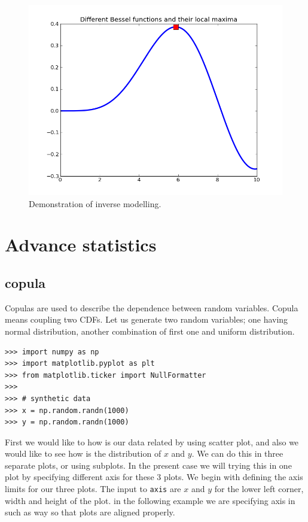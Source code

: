 \documentclass[10pt]{book}
\begin{document}
\beforefig
\begin{figure}[h!]
  \centering
    \includegraphics[scale=0.5]{images/inverse.png}
  \caption{Demonstration of inverse modelling.}
   \label{fig:inverse}
\end{figure}
\afterfig

\chapter{Advance statistics}

\section{copula}
Copulas are used to describe the dependence between random variables. Copula means coupling two CDFs. Let us generate two random variables; one having normal distribution, another combination of first one and uniform distribution.

\beforeverb \begin{verbatim}
>>> import numpy as np
>>> import matplotlib.pyplot as plt
>>> from matplotlib.ticker import NullFormatter
>>> 
>>> # synthetic data
>>> x = np.random.randn(1000)
>>> y = np.random.randn(1000)
\end{verbatim} \afterverb

First we would like to how is our data related by using scatter plot, and also we would like to see how is the distribution of $x$ and $y$. We can do this in three separate plots, or using subplots. In the present case we will trying this in one plot by specifying different axis for these 3 plots. We begin with defining the axis limits for our three plots. The input to \verb"axis" are $x$ and $y$ for the lower left corner, width and height of the plot. in the following example we are specifying axis in such as way so that plots are aligned properly. 
\end{document}
